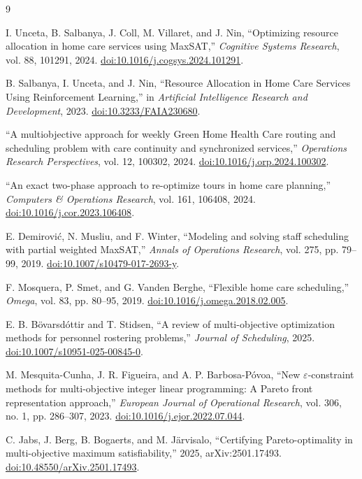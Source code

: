 \documentclass[12pt,a4paper]{article}
\begin{document}
\begin{thebibliography}{9}

I. Unceta, B. Salbanya, J. Coll, M. Villaret, and J. Nin,
``Optimizing resource allocation in home care services using MaxSAT,''
\emph{Cognitive Systems Research}, vol. 88, 101291, 2024.
\href{https://doi.org/10.1016/j.cogsys.2024.101291}
{doi:10.1016/j.cogsys.2024.101291}.

B. Salbanya, I. Unceta, and J. Nin,
``Resource Allocation in Home Care Services Using Reinforcement Learning,''
in \emph{Artificial Intelligence Research and Development}, 2023.
\href{https://doi.org/10.3233/FAIA230680}{doi:10.3233/FAIA230680}.

``A multiobjective approach for weekly Green Home Health Care routing and
scheduling problem with care continuity and synchronized services,''
\emph{Operations Research Perspectives}, vol. 12, 100302, 2024.
\href{https://doi.org/10.1016/j.orp.2024.100302}
{doi:10.1016/j.orp.2024.100302}.

``An exact two-phase approach to re-optimize tours in home care planning,''
\emph{Computers \& Operations Research}, vol. 161, 106408, 2024.
\href{https://doi.org/10.1016/j.cor.2023.106408}
{doi:10.1016/j.cor.2023.106408}.

E. Demirovi\'c, N. Musliu, and F. Winter,
``Modeling and solving staff scheduling with partial weighted MaxSAT,''
\emph{Annals of Operations Research}, vol. 275, pp. 79--99, 2019.
\href{https://doi.org/10.1007/s10479-017-2693-y}
{doi:10.1007/s10479-017-2693-y}.

F. Mosquera, P. Smet, and G. Vanden Berghe,
``Flexible home care scheduling,''
\emph{Omega}, vol. 83, pp. 80--95, 2019.
\href{https://doi.org/10.1016/j.omega.2018.02.005}
{doi:10.1016/j.omega.2018.02.005}.

E. B. B\"o\dh varsd\'ottir and T. Stidsen,
``A review of multi-objective optimization methods for personnel rostering
problems,'' \emph{Journal of Scheduling}, 2025.
\href{https://doi.org/10.1007/s10951-025-00845-0}
{doi:10.1007/s10951-025-00845-0}.

M. Mesquita-Cunha, J. R. Figueira, and A. P. Barbosa-P\'ovoa,
``New $\varepsilon$-constraint methods for multi-objective integer linear
programming: A Pareto front representation approach,''
\emph{European Journal of Operational Research}, vol. 306, no. 1,
pp. 286--307, 2023.
\href{https://doi.org/10.1016/j.ejor.2022.07.044}
{doi:10.1016/j.ejor.2022.07.044}.

C. Jabs, J. Berg, B. Bogaerts, and M. J\"arvisalo,
``Certifying Pareto-optimality in multi-objective maximum satisfiability,''
2025, arXiv:2501.17493.
\href{https://doi.org/10.48550/arXiv.2501.17493}
{doi:10.48550/arXiv.2501.17493}.

\end{thebibliography}
\end{document}

